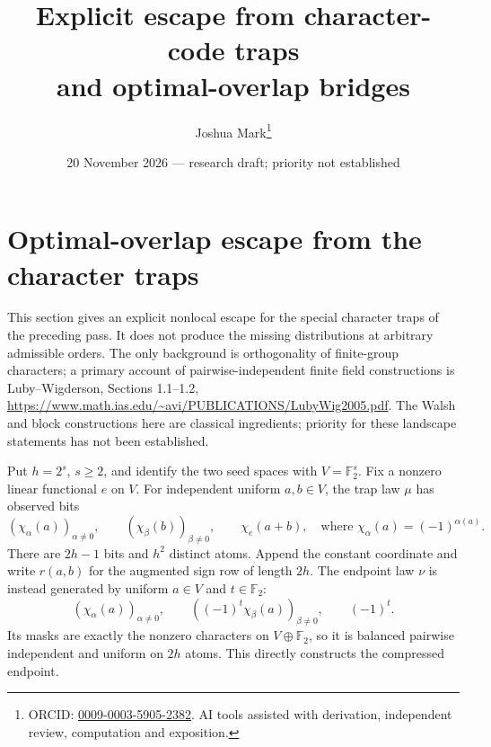 \documentclass[11pt]{article}
\title{Explicit escape from character-code traps\\and optimal-overlap bridges}
\author{Joshua Mark\thanks{ORCID: \href{https://orcid.org/0009-0003-5905-2382}{0009-0003-5905-2382}. AI tools assisted with derivation, independent review, computation and exposition.}}
\date{20 November 2026 --- research draft; priority not established}
\begin{document}
\maketitle
\section{Optimal-overlap escape from the character traps}
\label{sec:compression-escape}
This section gives an explicit nonlocal escape for the special character
traps of the preceding pass. It does not produce the missing distributions
at arbitrary admissible orders. The only background is orthogonality of
finite-group characters; a primary account of pairwise-independent finite
field constructions is Luby--Wigderson, Sections 1.1--1.2,
\url{https://www.math.ias.edu/~avi/PUBLICATIONS/LubyWig2005.pdf}.
The Walsh and block constructions here are classical ingredients; priority
for these landscape statements has not been established.

Put $h=2^s$, $s\ge2$, and identify the two seed spaces with
$V=\mathbb F_2^s$. Fix a nonzero linear functional $e$ on $V$.
For independent uniform $a,b\in V$, the trap law $\mu$ has observed bits
\[
 (\chi_\alpha(a))_{\alpha\ne0},\qquad
 (\chi_\beta(b))_{\beta\ne0},\qquad
 \chi_e(a+b),
 \quad\text{where }\chi_\alpha(a)=(-1)^{\alpha(a)}.
\]
There are $2h-1$ bits and $h^2$ distinct atoms. Append the constant
coordinate and write $r(a,b)$ for the augmented sign row of length $2h$.
The endpoint law $\nu$ is instead generated by uniform $a\in V$ and
$t\in\mathbb F_2$:
\begin{equation}\label{eq:compression-endpoint}
 (\chi_\alpha(a))_{\alpha\ne0},\qquad
 ((-1)^t\chi_\beta(a))_{\beta\ne0},\qquad (-1)^t.
\end{equation}
Its masks are exactly the nonzero characters on $V\oplus\mathbb F_2$,
so it is balanced pairwise independent and uniform on $2h$ atoms.
This directly constructs the compressed endpoint.
\end{document}
